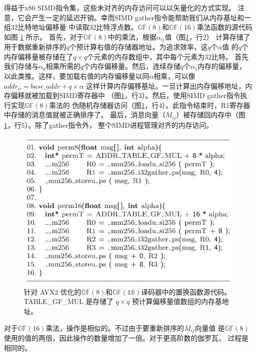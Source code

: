 \documentclass{cjc}
\begin{document}
  得益于x86 SIMD指令集，这些未对齐的内存访问可以以矢量化的方式实现。
  注意，它会产生一定的延迟开销。幸而SIMD gather指令能帮助我们从内存基址和一组32比特地址偏移量
  中读取32比特浮点数。$\mathbb{GF}(8)$和$\mathbb{GF}(16)$乘法函数的源代码如图 \ref{fig:2} 所示。
  首先，对于$\mathbb{GF}(8)$中的乘法，根据$\alpha_{ij}$值（图\ref{fig:2}，行2）
  计算存储了用于数据重新排序的$q$个预计算右值的存储器地址。为追求效率，这$q$个$\alpha$值
  的$q$个内存偏移量被存储在了$q\times{q}$个元素的内存数组中，其中每个元素为32比特。
  首先我们存储与$\alpha_0$相乘所需的$q$个内存偏移量。然后，连续存储$q$个$\alpha_1$内存的偏移量，
  以此类推。这样，要加载右值的内存偏移量以同$\alpha$相乘，可以像$addr_{\alpha}=base\_addr+q\times\alpha$
  这样计算内存偏移基址。一旦计算出内存偏移地址，内存偏移就被加载到SIMD寄存器中
  （图\ref{fig:2}，行3）。然后，使用SIMD gather指令执行实现$\mathbb{GF}(8)$乘法的
  伪随机存储器访问（图\ref{fig:2}，行4）。此指令结束时，R1寄存器中存储的消息值就被正确排序了。
  最后，消息向量（$M_{ij}$）被存储回内存中（图\ref{fig:2}，行5）。除了gather指令外，
  整个SIMD进程管理对齐的内存访问。
  
\begin{figure}
  \includegraphics[width=\linewidth]{assets/fig2.png}
  \caption{
    针对 AVX2 优化的$\mathbb{GF}(8)$和$\mathbb{GF(16)}$译码器中的置换函数源代码。
    TABLE\_GF\_MUL 是存储了 $q\times{q}$ 预计算偏移量值数组的内存基地址。
  }\label{fig:2}
\end{figure}

  对于$\mathbb{GF}(16)$乘法，操作是相似的。不过由于要重新排序的$M_{ij}$向量值
  是$\mathbb{GF}(8)$使用的值的两倍，因此操作的数量增加了一倍。对于更高阶数的伽罗瓦，
  过程是相同的。
\end{document}
